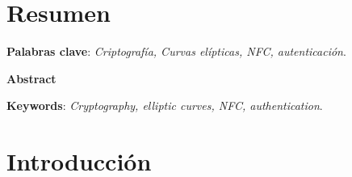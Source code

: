 \documentclass[a4paper,12pt, twoside, openright,makeidx]{book}
\begin{document}
\tableofcontents{}
\listoffigures

\chapter{Resumen}
\label{Resumen}


\label{Keywords}
\begin{center}
\textbf{Palabras clave}: \textit{Criptografía, Curvas elípticas, NFC, autenticación}.
\end{center}

\newpage
\label{Abstract}
\begin{center}
\textbf{Abstract}
\end{center}


\label{Keywords}
\begin{center}
\textbf{Keywords}: \textit{Cryptography, elliptic curves, NFC, authentication}.
\end{center}

\chapter{Introducción}
\label{Introducción}




%
%
%
%
%
%
%
%
%
\end{document}
